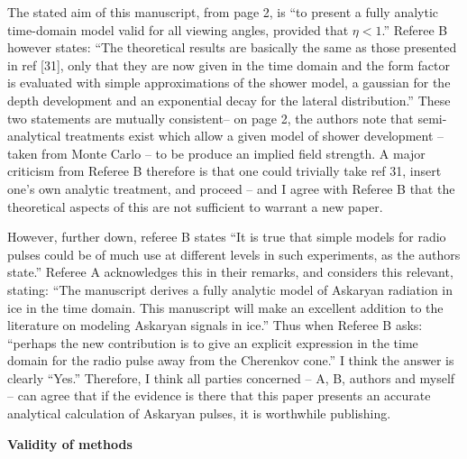 \documentclass[12pt]{article}
\begin{document}
The stated aim of this manuscript, from page 2, is ``to present a fully analytic time-domain model valid for all viewing angles, provided that $\eta < 1$.''  Referee B however states: ``The theoretical results are basically the same as those presented in ref [31], only that they are now given in the time domain and the form factor is evaluated with simple approximations of the shower model, a gaussian for the depth development and an exponential decay for the lateral distribution.''  These two statements are mutually consistent– on page 2, the authors note that semi-analytical treatments exist which allow a given model of shower development – taken from Monte Carlo – to be produce an implied field strength.  A major criticism from Referee B therefore is that one could trivially take ref 31, insert one's own analytic treatment, and proceed – and I agree with Referee B that the theoretical aspects of this are not sufficient to warrant a new paper.

However, further down, referee B states ``It is true that simple models for radio pulses could be of much use at different levels in such experiments, as the authors state.''  Referee A acknowledges this in their remarks, and considers this relevant, stating: ``The manuscript derives a fully analytic model of Askaryan radiation in ice in the time domain. This manuscript will make an excellent addition to the literature on modeling Askaryan signals in ice.'' Thus when Referee B asks: ``perhaps the new contribution is to give an explicit expression in the time domain for the radio pulse away from the Cherenkov cone.''  I think the answer is clearly ``Yes.'' Therefore, I think all parties concerned – A, B, authors and myself – can agree that if the evidence is there that this paper presents an accurate analytical calculation of Askaryan pulses, it is worthwhile publishing.

\clearpage

\textbf{Validity of methods} \\
\end{document}
